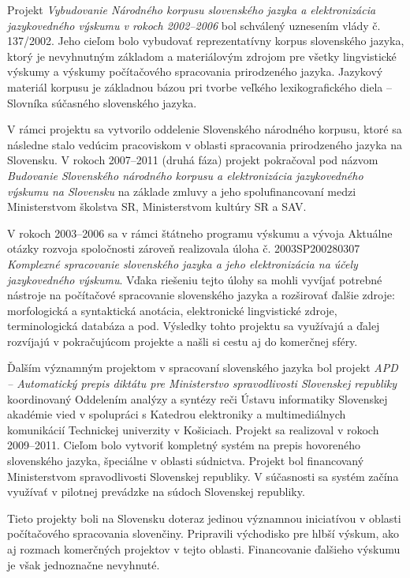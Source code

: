 \begin{multicols}{2}
Projekt \emph{Vybudovanie Národného korpusu slovenského jazyka a elektronizácia jazykovedného výskumu v rokoch 2002–2006} bol schválený uznesením vlády č. 137/2002. Jeho cieľom bolo vybudovať reprezentatívny korpus slovenského jazyka, ktorý je nevyhnutným základom a materiálovým zdrojom pre všetky lingvistické výskumy a výskumy počítačového spracovania prirodzeného jazyka. Jazykový materiál korpusu je základnou bázou pri tvorbe veľkého lexikografického diela -- Slovníka súčasného slovenského jazyka. 

V rámci projektu sa vytvorilo oddelenie Slovenského národného korpusu, ktoré sa následne stalo vedúcim pracoviskom v oblasti spracovania prirodzeného jazyka na Slovensku. V rokoch 2007--2011 (druhá fáza) projekt pokračoval pod názvom \emph{Budovanie Slovenského národného korpusu a elektronizácia jazykovedného výskumu na Slovensku} na základe zmluvy a jeho spolufinancovaní medzi Ministerstvom školstva SR, Ministerstvom kultúry SR a SAV.

V rokoch 2003--2006 sa v rámci štátneho programu výskumu a vývoja Aktuálne otázky rozvoja spoločnosti zároveň realizovala úloha č. 2003SP200280307 \emph{Komplexné spracovanie slovenského jazyka a jeho elektronizácia na účely jazykovedného výskumu}. Vďaka riešeniu tejto úlohy sa mohli vyvíjať potrebné nástroje na počítačové spracovanie slovenského jazyka a rozširovať ďalšie zdroje: morfologická a syntaktická anotácia, elektronické lingvistické zdroje, terminologická databáza a pod. Výsledky tohto projektu sa využívajú a ďalej rozvíjajú v pokračujúcom projekte a našli si cestu aj do komerčnej sféry.

Ďalším významným projektom v spracovaní slovenského jazyka bol projekt \emph{APD
--  Automatický prepis diktátu pre Ministerstvo spravodlivosti Slovenskej
republiky} koordinovaný Oddelením analýzy a syntézy reči Ústavu informatiky
Slovenskej akadémie vied v spolupráci s Katedrou elektroniky a multimediálnych
komunikácií Technickej univerzity v Košiciach. Projekt sa realizoval v rokoch
2009--2011. Cieľom bolo vytvoriť kompletný systém na prepis hovoreného
slovenského jazyka, špeciálne v oblasti súdnictva. Projekt bol financovaný
Ministerstvom spravodlivosti Slovenskej republiky. V súčasnosti sa systém začína
využívať v pilotnej prevádzke na súdoch Slovenskej republiky.

Tieto projekty boli na Slovensku doteraz jedinou významnou iniciatívou v oblasti počítačového spracovania slovenčiny. Pripravili východisko pre hlbší výskum, ako aj rozmach komerčných projektov v tejto oblasti. Financovanie ďalšieho výskumu je však jednoznačne nevyhnuté. 



\end{multicols}
